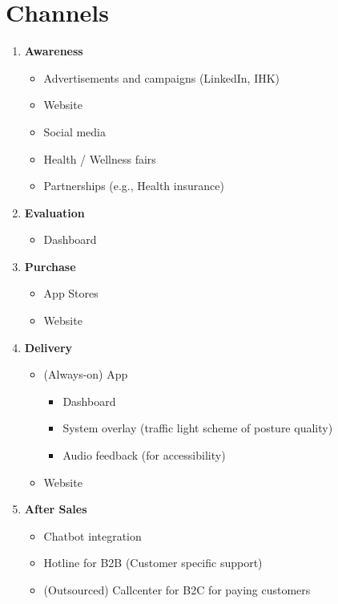 \section{Channels}
\begin{enumerate}
    \item \textbf{Awareness}
        \begin{itemize}
            \item Advertisements and campaigns (LinkedIn, IHK)
            \item Website
            \item Social media
            \item Health / Wellness fairs
            \item Partnerships (e.g., Health insurance)
        \end{itemize}
    \item \textbf{Evaluation}
        \begin{itemize}
            \item Dashboard
        \end{itemize}
    \item \textbf{Purchase}
        \begin{itemize}
            \item App Stores
            \item Website
        \end{itemize}
    \item \textbf{Delivery}
        \begin{itemize}
            \item (Always-on) App
            \begin{itemize}
                \item Dashboard
                \item System overlay (traffic light scheme of posture quality)
                \item Audio feedback (for accessibility)
            \end{itemize}
            \item Website
        \end{itemize}
    \item \textbf{After Sales}
        \begin{itemize}
            \item Chatbot integration
            \item Hotline for B2B (Customer specific support)
            \item (Outsourced) Callcenter for B2C for paying customers
        \end{itemize}
\end{enumerate}

